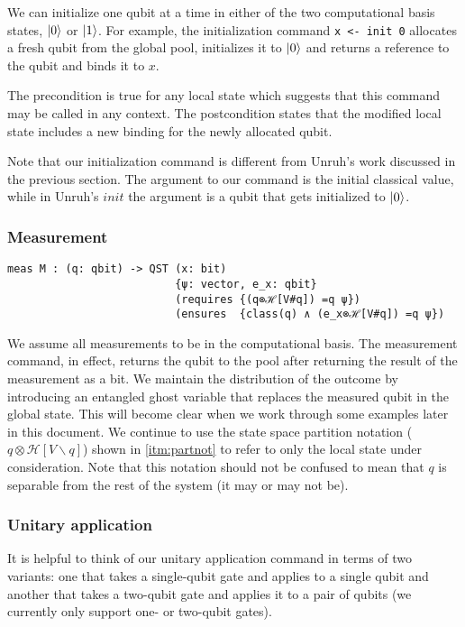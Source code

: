 \documentclass[adraft,creativecommons]{eptcs}
\theoremstyle{definition}
\theoremstyle{remark}
\begin{document}
We can initialize one qubit at a time in either of the two computational basis states, $\ket{0}$ or $\ket{1}$. For example, the initialization command \lstinline[language=QHaskell]{x <- init 0} allocates a fresh qubit from the global pool, initializes it to $\ket{0}$ and returns a reference to the qubit and binds it to $x$.

The precondition is true for any local state which suggests that this command may be called in any context. The postcondition states that the modified local state includes a new binding for the newly allocated qubit.

Note that our initialization command is different from Unruh's work discussed in the previous section. The argument to our command is the initial classical value, while in Unruh's $init$ the argument is a qubit that gets initialized to $\ket{0}$.

\subsubsection{Measurement}

\begin{lstlisting}[language=QHaskell]
meas M : (q: qbit) -> QST (x: bit)
                          {ψ: vector, e_x: qbit}
                          (requires {(q⊗ℋ[V#q]) =q ψ})
                          (ensures  {class(q) ∧ (e_x⊗ℋ[V#q]) =q ψ})
\end{lstlisting}

We assume all measurements to be in the computational basis. The measurement command, in effect, returns the qubit to the pool after returning the result of the measurement as a bit. We maintain the distribution of the outcome by introducing an entangled ghost variable that replaces the measured qubit in the global state. This will become clear when we work through some examples later in this document. We continue to use the state space partition notation ($q\otimes\mathcal{H}[V\backslash q]$) shown in \cref{itm:partnot} to refer to only the local state under consideration. Note that this notation should not be confused to mean that $q$ is separable from the rest of the system (it may or may not be).

\subsubsection{Unitary application}
It is helpful to think of our unitary application command in terms of two variants: one that takes a single-qubit gate and applies to a single qubit and another that takes a two-qubit gate and applies it to a pair of qubits (we currently only support one- or two-qubit gates).
\end{document}
